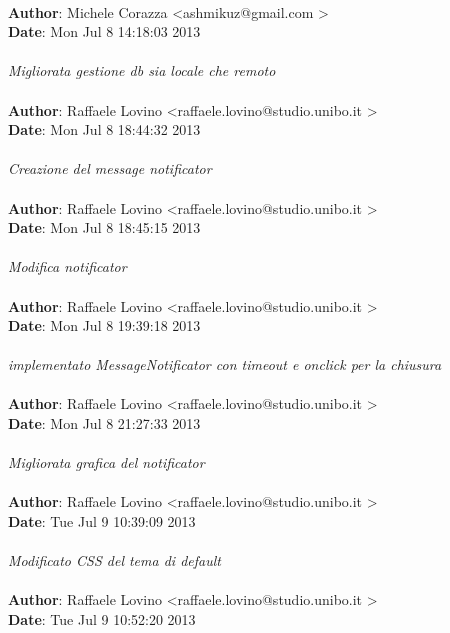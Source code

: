 \documentclass[a4paper,12pt]{article} %
\begin{document}
\\
\textbf{Author}: Michele Corazza \textless ashmikuz@gmail.com \textgreater \\
\textbf{Date}:   Mon Jul 8 14:18:03 2013 \\
\\
    \emph{Migliorata gestione db sia locale che remoto}\\
\\
\textbf{Author}: Raffaele Lovino \textless raffaele.lovino@studio.unibo.it \textgreater \\
\textbf{Date}:   Mon Jul 8 18:44:32 2013 \\
\\
    \emph{Creazione del message notificator}\\
\\
\textbf{Author}: Raffaele Lovino \textless raffaele.lovino@studio.unibo.it \textgreater \\
\textbf{Date}:   Mon Jul 8 18:45:15 2013 \\
\\
    \emph{Modifica notificator}\\
\\
\textbf{Author}: Raffaele Lovino \textless raffaele.lovino@studio.unibo.it \textgreater \\
\textbf{Date}:   Mon Jul 8 19:39:18 2013 \\
\\
    \emph{implementato MessageNotificator con timeout e onclick per la chiusura}\\
\\
\textbf{Author}: Raffaele Lovino \textless raffaele.lovino@studio.unibo.it \textgreater \\
\textbf{Date}:   Mon Jul 8 21:27:33 2013 \\
\\
    \emph{Migliorata grafica del notificator}\\
\\
\textbf{Author}: Raffaele Lovino \textless raffaele.lovino@studio.unibo.it \textgreater \\
\textbf{Date}:   Tue Jul 9 10:39:09 2013 \\
\\
    \emph{Modificato CSS del tema di default}\\
\\
\textbf{Author}: Raffaele Lovino \textless raffaele.lovino@studio.unibo.it \textgreater \\
\textbf{Date}:   Tue Jul 9 10:52:20 2013 \\
\end{document}
